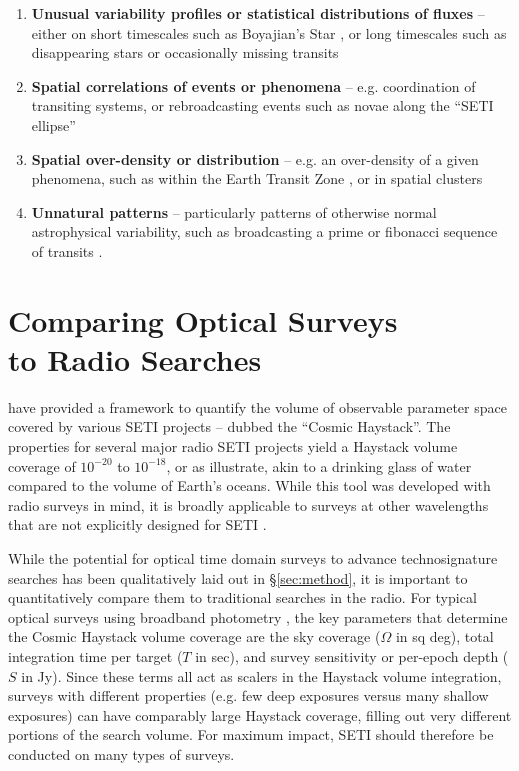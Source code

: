 \documentclass[twocolumn]{aastex62}
\begin{document}
\begin{enumerate}
\item {\bf Unusual variability profiles or statistical distributions of fluxes }-- either on short timescales such as Boyajian's Star \citep{boyajian2015}, or long timescales such as disappearing stars \citep{villarroel2016} or occasionally missing transits \citep{kipping2016}
%
\item {\bf Spatial correlations of events or phenomena }-- e.g. coordination of transiting systems, or rebroadcasting events such as novae along the ``SETI ellipse'' \citep{makovetskii1977,lemarchand1994,tarter2001,shostak2004}
%
\item {\bf Spatial over-density or distribution} -- e.g. an over-density of a given phenomena, such as within the Earth Transit Zone \citep{heller2016}, or in spatial clusters
%
\item {\bf Unnatural patterns} -- particularly patterns of otherwise normal astrophysical variability, such as broadcasting a prime or fibonacci sequence of transits \citep{arnold2005,wright2016}.
%
\end{enumerate}




\section{Comparing Optical Surveys\\ to Radio Searches}
\label{sec:haystack}

\citet{wright2018c} have provided a framework to quantify the volume of observable parameter space covered by various SETI projects -- dubbed the ``Cosmic Haystack''. The properties for several major radio SETI projects yield a Haystack volume coverage of $10^{-20}$ to $10^{-18}$, or as \citet{wright2018c} illustrate, akin to a drinking glass of water compared to the volume of Earth's oceans. While this tool was developed with radio surveys in mind, it is broadly applicable to surveys at other wavelengths that are not explicitly designed for SETI \citep[e.g. see][]{forgan2019}.


While the potential for optical time domain surveys to advance technosignature searches has been qualitatively laid out in \S\ref{sec:method}, it is important to quantitatively compare them to traditional searches in the radio. 
For typical optical surveys using broadband photometry \citep{djorgovski2013}, the key parameters that determine the Cosmic Haystack volume coverage are the sky coverage ($\Omega$ in sq deg), total integration time per target ($T$ in sec), and survey sensitivity or per-epoch depth ($S$ in Jy).
Since these terms all act as scalers in the Haystack volume integration, surveys with different properties (e.g. few deep exposures versus many shallow exposures) can have comparably large Haystack coverage, filling out very different portions of the search volume. For maximum impact, SETI should therefore be conducted on many types of surveys.
\end{document}
